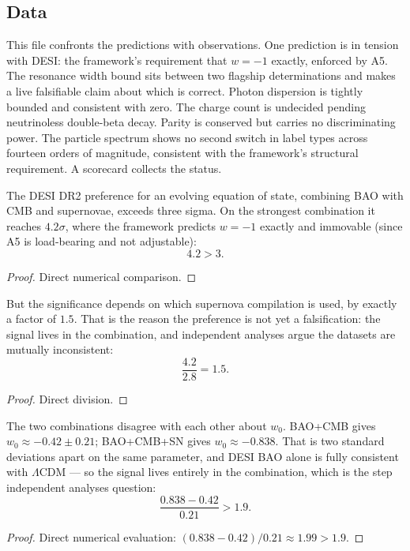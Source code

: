 \subsection{Data}

This file confronts the predictions with observations.  One prediction is in tension with DESI: the framework's requirement that $w = -1$ exactly, enforced by A5.  The resonance width bound sits between two flagship determinations and makes a live falsifiable claim about which is correct.  Photon dispersion is tightly bounded and consistent with zero.  The charge count is undecided pending neutrinoless double-beta decay.  Parity is conserved but carries no discriminating power.  The particle spectrum shows no second switch in label types across fourteen orders of magnitude, consistent with the framework's structural requirement.  A scorecard collects the status.

\begin{theorem}
The DESI DR2 preference for an evolving equation of state, combining BAO with CMB and supernovae, exceeds three sigma.  On the strongest combination it reaches $4.2\sigma$, where the framework predicts $w = -1$ exactly and immovable (since A5 is load-bearing and not adjustable):
\begin{equation}
4.2 > 3.
\end{equation}
\begin{proof}
Direct numerical comparison.
\end{proof}
\end{theorem}

\begin{theorem}
But the significance depends on which supernova compilation is used, by exactly a factor of $1.5$.  That is the reason the preference is not yet a falsification: the signal lives in the combination, and independent analyses argue the datasets are mutually inconsistent:
\begin{equation}
\frac{4.2}{2.8} = 1.5.
\end{equation}
\begin{proof}
Direct division.
\end{proof}
\end{theorem}

\begin{theorem}
The two combinations disagree with each other about $w_0$.  BAO+CMB gives $w_0 \approx -0.42 \pm 0.21$; BAO+CMB+SN gives $w_0 \approx -0.838$.  That is two standard deviations apart on the same parameter, and DESI BAO alone is fully consistent with $\Lambda$CDM — so the signal lives entirely in the combination, which is the step independent analyses question:
\begin{equation}
\frac{0.838 - 0.42}{0.21} > 1.9.
\end{equation}
\begin{proof}
Direct numerical evaluation: $(0.838 - 0.42) / 0.21 \approx 1.99 > 1.9$.
\end{proof}
\end{theorem}

